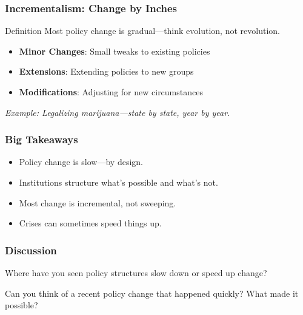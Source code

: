 \documentclass[10pt]{beamer}
\begin{document}
\begin{frame}
\frametitle{Incrementalism: Change by Inches}

\begin{alertblock}{Definition}
Most policy change is gradual---think evolution, not revolution.
\end{alertblock}

\vspace{0.5cm}

\begin{itemize}
\item<1-> \textbf{Minor Changes}: Small tweaks to existing policies
\item<2-> \textbf{Extensions}: Extending policies to new groups  
\item<3-> \textbf{Modifications}: Adjusting for new circumstances
\end{itemize}

\pause
\vspace{1cm}

\centering
\emph{Example: Legalizing marijuana---state by state, year by year.}

\end{frame}

\begin{frame}
\frametitle{Big Takeaways}

\begin{itemize}
\item<1-> Policy change is slow---by design.
\item<2-> Institutions structure what's possible and what's not.
\item<3-> Most change is incremental, not sweeping.
\item<4-> Crises can sometimes speed things up.
\end{itemize}

\end{frame}

\begin{frame}
\frametitle{Discussion}

\begin{block}{}
Where have you seen policy structures slow down or speed up change?

Can you think of a recent policy change that happened quickly? What made it possible?
\end{block}

\end{frame}
\end{document}
